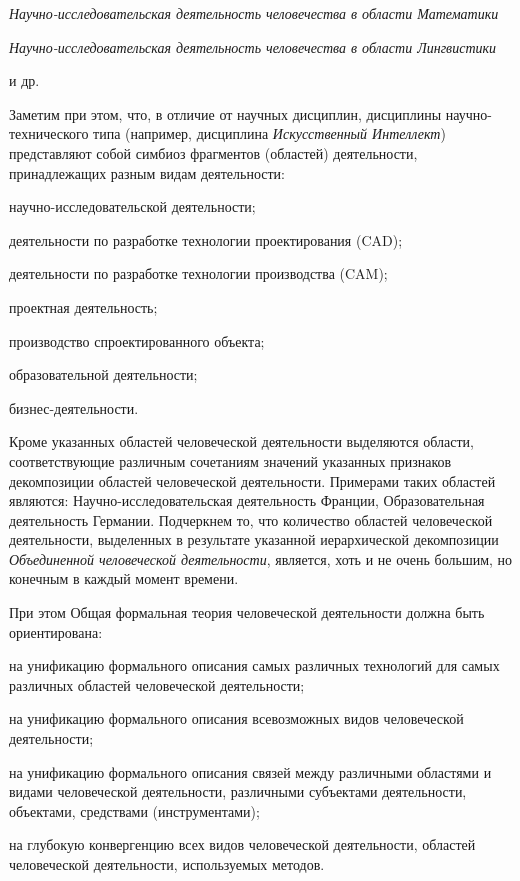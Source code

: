 {\begin{scnitemize}
\begin{scnitemizeii}
    	\item \textit{Научно-исследовательская деятельность человечества в области Математики}
    	\item \textit{Научно-исследовательская деятельность человечества в области Лингвистики}
    	\item и др.
    \end{scnitemizeii}    
    Заметим при этом, что, в отличие от  научных дисциплин, дисциплины научно-технического типа (например, дисциплина \textit{Искусственный Интеллект}) представляют собой симбиоз фрагментов (областей) деятельности, принадлежащих разным видам деятельности:
    \begin{scnitemizeii}
        \item научно-исследовательской деятельности;
        \item деятельности по разработке технологии проектирования (CAD);
        \item деятельности по разработке технологии производства (CAM);
        \item проектная деятельность;
        \item производство спроектированного объекта;
        \item образовательной деятельности;
        \item бизнес-деятельности.
    \end{scnitemizeii}
    Кроме указанных областей человеческой деятельности выделяются области, соответствующие различным сочетаниям значений указанных признаков декомпозиции областей человеческой деятельности. Примерами таких областей являются: Научно-исследовательская деятельность Франции, Образовательная деятельность Германии. Подчеркнем то, что количество областей человеческой деятельности, выделенных в результате указанной иерархической декомпозиции \textit{Объединенной человеческой деятельности}, является, хоть и не очень большим, но конечным в каждый момент времени.
\end{scnitemize}\bigskip

При этом Общая формальная теория человеческой деятельности должна быть ориентирована:
\begin{scnitemize}
    \item на унификацию формального описания самых различных технологий для самых различных областей человеческой деятельности;
    \item на унификацию формального описания всевозможных видов человеческой деятельности;
    \item на унификацию формального описания связей между различными областями и видами человеческой деятельности, различными субъектами деятельности, объектами, средствами (инструментами);
    \item на глубокую конвергенцию всех видов человеческой деятельности, областей человеческой деятельности, используемых методов.
\end{scnitemize}}
